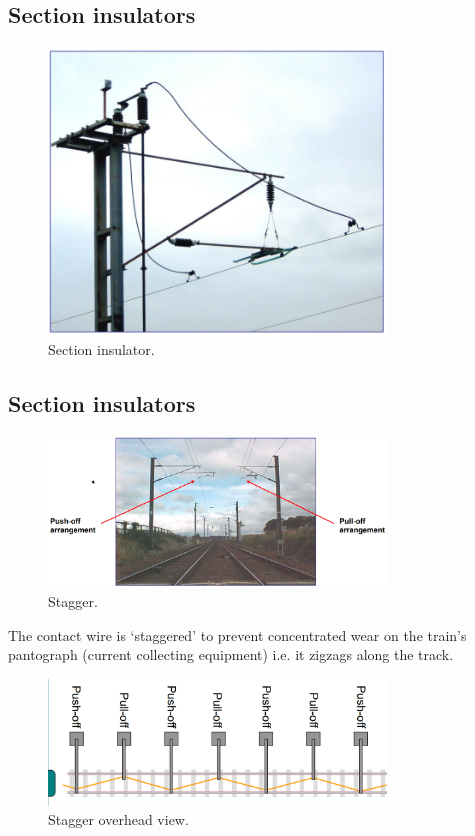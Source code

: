 \subsection{Section insulators}
\begin{figure}[H]
    \centering
    \includegraphics[width = 0.8\textwidth]{img/figure139.png}
    \caption{Section insulator.}
\end{figure}
\subsection{Section insulators}
\begin{figure}[H]
    \centering
    \includegraphics[width = 0.8\textwidth]{img/figure140.png}
    \caption{Stagger.}
\end{figure}
The contact wire is `staggered' to prevent concentrated wear on the train's pantograph (current collecting equipment) i.e. it zigzags along the track.
\begin{figure}[H]
    \centering
    \includegraphics[width = 0.8\textwidth]{img/figure141.png}
    \caption{Stagger overhead view.}
\end{figure}
